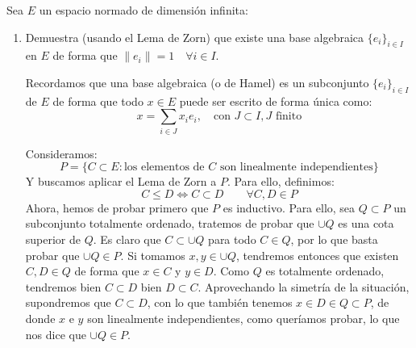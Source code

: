 \begin{ejercicio}
    Sea $E$ un espacio normado de dimensión infinita:
    \begin{enumerate}[label=\alph*)]
        \item Demuestra (usando el Lema de Zorn) que existe una base algebraica $\{e_i\}_{i \in I}$ en $E$ de forma que $\|e_i\| = 1\quad \forall i \in I$.

            Recordamos que una base algebraica (o de Hamel) es un subconjunto $\{e_i\}_{i \in I}$ de $E$ de forma que todo $x\in E$ puede ser escrito de forma única como:
            \begin{equation*}
                x = \sum_{i \in J} x_i e_i, \quad \text{con\ } J\subset I, J \text{\ finito}
            \end{equation*}

            Consideramos:
            \begin{equation*}
                P = \{C\subset E : \text{los elementos de\ } C \text{\ son linealmente independientes}\}
            \end{equation*}
            Y buscamos aplicar el Lema de Zorn a $P$. Para ello, definimos:
            \begin{equation*}
                C \leq D \Longleftrightarrow C \subset D \qquad \forall C,D\in P
            \end{equation*}
            Ahora, hemos de probar primero que $P$ es inductivo. Para ello, sea $Q\subset P$ un subconjunto totalmente ordenado, tratemos de probar que $\cup Q$ es una cota superior de $Q$. Es claro que $C\subset \cup Q$ para todo $C\in Q$, por lo que basta probar que $\cup Q \in P$. Si tomamos $x,y\in \cup Q$, tendremos entonces que existen $C,D\in Q$ de forma que $x\in C$ y $y\in D$. Como $Q$ es totalmente ordenado, tendremos bien $C\subset D$ bien $D\subset C$. Aprovechando la simetría de la situación, supondremos que $C\subset D$, con lo que también tenemos $x\in D\in Q\subset P$, de donde $x$ e $y$ son linealmente independientes, como queríamos probar, lo que nos dice que $\cup Q \in P$.


\end{enumerate}
\end{ejercicio}
